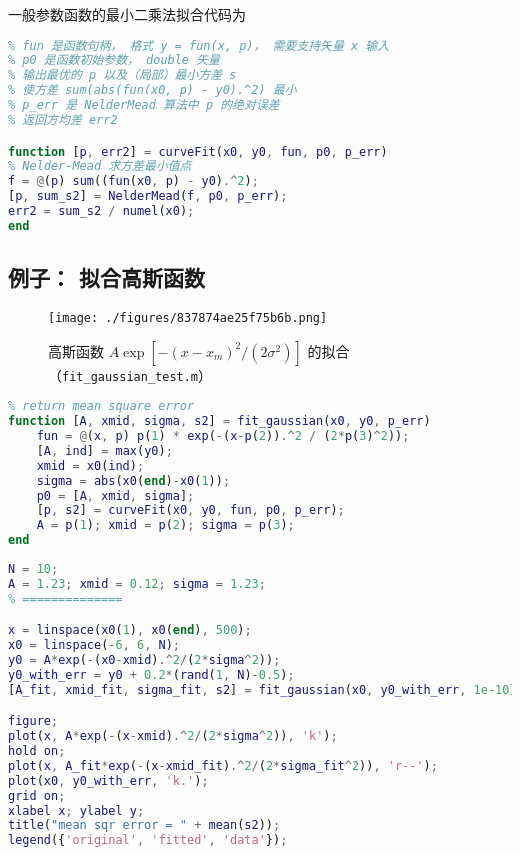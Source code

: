 一般参数函数的最小二乘法拟合代码为
\begin{lstlisting}[language=matlab, caption=curveFit.m]
% 最小二乘法拟合一元实函数，(x0,y0) 是数据点
% fun 是函数句柄， 格式 y = fun(x, p)， 需要支持矢量 x 输入
% p0 是函数初始参数， double 矢量
% 输出最优的 p 以及（局部）最小方差 s
% 使方差 sum(abs(fun(x0, p) - y0).^2) 最小
% p_err 是 NelderMead 算法中 p 的绝对误差
% 返回方均差 err2

function [p, err2] = curveFit(x0, y0, fun, p0, p_err)
% Nelder-Mead 求方差最小值点
f = @(p) sum((fun(x0, p) - y0).^2);
[p, sum_s2] = NelderMead(f, p0, p_err);
err2 = sum_s2 / numel(x0);
end
\end{lstlisting}

\subsection{例子： 拟合高斯函数}
\begin{figure}[ht]
\centering
\texttt{[image: ./figures/837874ae25f75b6b.png]}
\caption{高斯函数 $A\exp[-(x-x_m)^2/(2\sigma^2)]$ 的拟合（\verb|fit_gaussian_test.m|）} \label{fig_CurFit_2}
\end{figure}

\begin{lstlisting}[language=matlab,caption=fit\_gaussian.m]
% fit a gaussian distribution
% return mean square error
function [A, xmid, sigma, s2] = fit_gaussian(x0, y0, p_err)
    fun = @(x, p) p(1) * exp(-(x-p(2)).^2 / (2*p(3)^2));
    [A, ind] = max(y0);
    xmid = x0(ind);
    sigma = abs(x0(end)-x0(1));
    p0 = [A, xmid, sigma];
    [p, s2] = curveFit(x0, y0, fun, p0, p_err);
    A = p(1); xmid = p(2); sigma = p(3);
end
\end{lstlisting}

\begin{lstlisting}[language=matlab,caption=fit\_gaussian\_test.m]
% === params ===
N = 10;
A = 1.23; xmid = 0.12; sigma = 1.23;
% ==============

x = linspace(x0(1), x0(end), 500);
x0 = linspace(-6, 6, N);
y0 = A*exp(-(x0-xmid).^2/(2*sigma^2));
y0_with_err = y0 + 0.2*(rand(1, N)-0.5);
[A_fit, xmid_fit, sigma_fit, s2] = fit_gaussian(x0, y0_with_err, 1e-10);

figure;
plot(x, A*exp(-(x-xmid).^2/(2*sigma^2)), 'k');
hold on;
plot(x, A_fit*exp(-(x-xmid_fit).^2/(2*sigma_fit^2)), 'r--');
plot(x0, y0_with_err, 'k.');
grid on;
xlabel x; ylabel y;
title("mean sqr error = " + mean(s2));
legend({'original', 'fitted', 'data'});
\end{lstlisting}
